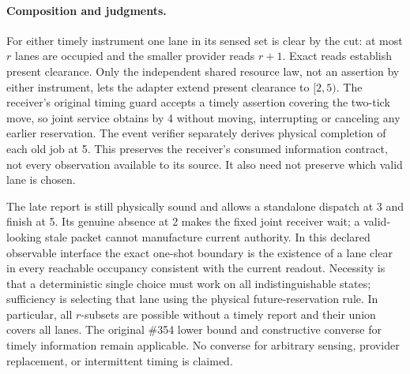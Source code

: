 \documentclass[11pt]{article}
\begin{document}
\paragraph{Composition and judgments.}
For either timely instrument one lane in its sensed set is clear by the cut: at most $r$ lanes are occupied and the smaller provider reads $r+1$. Exact reads establish present clearance. Only the independent shared resource law, not an assertion by either instrument, lets the adapter extend present clearance to $[2,5)$. The receiver's original timing guard accepts a timely assertion covering the two-tick move, so joint service obtains by 4 without moving, interrupting or canceling any earlier reservation. The event verifier separately derives physical completion of each old job at 5. This preserves the receiver's consumed information contract, not every observation available to its source. It also need not preserve which valid lane is chosen.

The late report is still physically sound and allows a standalone dispatch at 3 and finish at 5. Its genuine absence at 2 makes the fixed joint receiver wait; a valid-looking stale packet cannot manufacture current authority. In this declared observable interface the exact one-shot boundary is the existence of a lane clear in every reachable occupancy consistent with the current readout. Necessity is that a deterministic single choice must work on all indistinguishable states; sufficiency is selecting that lane using the physical future-reservation rule. In particular, all $r$-subsets are possible without a timely report and their union covers all lanes. The original \#354 lower bound and constructive converse for timely information remain applicable. No converse for arbitrary sensing, provider replacement, or intermittent timing is claimed.
\end{document}

